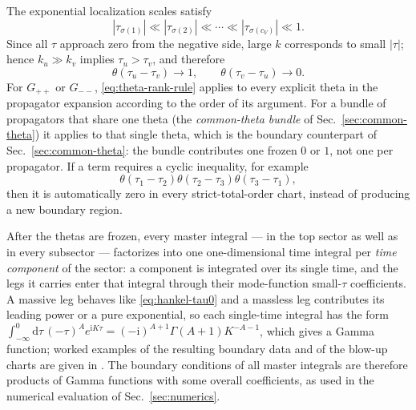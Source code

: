 \documentclass[11pt,a4paper]{article}
\numberwithin{table}{section}
\newcommand{\nd}{\mathrm{d}}
\newcommand{\ii}{\mathrm i}
\begin{document}
The exponential localization scales satisfy
\begin{equation}
|\tau_{\sigma(1)}|\ll|\tau_{\sigma(2)}|\ll\cdots
 \ll|\tau_{\sigma(c_V)}|\ll1.
 \label{eq:tau-rank}
\end{equation}
Since all $\tau$ approach zero from the negative side, large $k$ corresponds to small $|\tau|$;
hence $k_u\gg k_v$ implies $\tau_u>\tau_v$, and therefore
\begin{equation}
 \theta(\tau_u-\tau_v)\longrightarrow1,
 \qquad
 \theta(\tau_v-\tau_u)\longrightarrow0.
 \label{eq:theta-rank-rule}
\end{equation}
For $G_{++}$ or $G_{--}$, \eqref{eq:theta-rank-rule} applies to every explicit theta in the
propagator expansion according to the order of its argument. For a bundle of propagators that share
one theta (the \emph{common-theta bundle} of Sec.~\ref{sec:common-theta}) it applies to that single
theta, which is the boundary counterpart of Sec.~\ref{sec:common-theta}: the bundle contributes one
frozen $0$ or $1$, not one per propagator. If a term requires a cyclic
inequality, for example
\begin{equation}
 \theta(\tau_1-\tau_2)\theta(\tau_2-\tau_3)\theta(\tau_3-\tau_1),
 \label{eq:cyclic-theta}
\end{equation}
then it is automatically zero in every strict-total-order chart, instead of producing a new
boundary region.

After the thetas are frozen, every master integral --- in the top sector as well as in every
subsector --- factorizes into one one-dimensional time integral per \emph{time component} of the
sector: a component is integrated over its single time, and the legs it carries enter that
integral through their mode-function small-$\tau$ coefficients. A massive leg behaves like
\eqref{eq:hankel-tau0} and a massless leg contributes its leading power or a pure exponential, so
each single-time integral has the form
$\int_{-\infty}^0\nd\tau\,(-\tau)^{A}e^{\ii K\tau}=(-\ii)^{A+1}\Gamma(A+1)K^{-A-1}$, which gives a
Gamma function; worked examples of the resulting boundary data and of the blow-up charts are given
in \cite{Chen:2024glu,Chen:2023iix}. The boundary conditions of all master integrals are therefore
products of Gamma functions with some overall coefficients, as used in the numerical evaluation of
Sec.~\ref{sec:numerics}.
\end{document}
